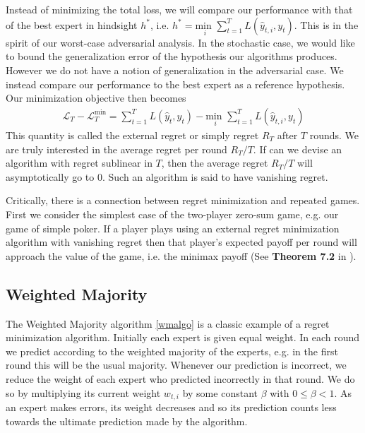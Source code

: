 \documentclass{article}
\begin{document}
Instead of minimizing the total loss, we will compare our performance with that of the best expert in hindsight $h^*$, i.e. $h^* = \underset{i}{\text{min }} \sum_{t=1}^T L(\hat y_{t,i}, y_t)$. This is in the spirit of our worst-case adversarial analysis. In the stochastic case, we would like to bound the generalization error of the hypothesis our algorithms produces. However we do not have a notion of generalization in the adversarial case. We instead compare our performance to the best expert as a reference hypothesis. Our minimization objective then becomes
\begin{align*}
\mathcal{L}_T - \mathcal{L}_T^{\text{min}} = \sum_{t=1}^T L(\hat y_t, y_t) - \underset{i}{\text{min }} \sum_{t=1}^T L(\hat y_{t,i}, y_t)
\end{align*}
This quantity is called the external regret or simply regret $R_T$ after $T$ rounds. We are truly interested in the average regret per round $R_T/T$. If can we devise an algorithm with regret sublinear in $T$, then the average regret $R_T/T$ will asymptotically go to 0. Such an algorithm is said to have vanishing regret.

Critically, there is a connection between regret minimization and repeated games. First we consider the simplest case of the two-player zero-sum game, e.g. our game of simple poker. If a player plays using an external regret minimization algorithm with vanishing regret then that player's expected payoff per round will approach the value of the game, i.e. the minimax payoff (See \textbf{Theorem 7.2} in \cite{cesa2006prediction}).

\subsection{Weighted Majority}

The Weighted Majority algorithm \autoref{wmalgo} \cite{littlestone1994weighted} is a classic example of a regret minimization algorithm. Initially each expert is given equal weight. In each round we predict according to the weighted majority of the experts, e.g. in the first round this will be the usual majority. Whenever our prediction is incorrect, we reduce the weight of each expert who predicted incorrectly in that round. We do so by multiplying its current weight $w_{t,i}$ by some constant $\beta$ with $0 \le \beta < 1$. As an expert makes errors, its weight decreases and so its prediction counts less towards the ultimate prediction made by the algorithm.
\end{document}

